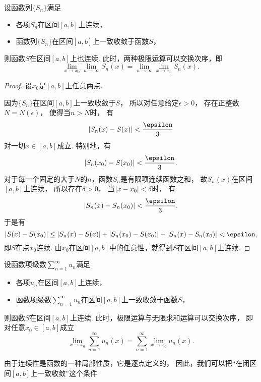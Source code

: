 \begin{theorem}\label{theorem:函数项级数.连续函数列的一致收敛性保证极限函数的连续性}
设函数列\(\{S_n\}\)满足\begin{itemize}
	\item 各项\(S_n\)在区间\([a,b]\)上连续，
	\item 函数列\(\{S_n\}\)在区间\([a,b]\)上一致收敛于函数\(S\)，
\end{itemize}
则函数\(S\)在区间\([a,b]\)上也连续.
此时，两种极限运算可以交换次序，即\[
	\lim_{x \to x_0} \lim_{n\to\infty} S_n(x)
	= \lim_{n\to\infty} \lim_{x \to x_0} S_n(x).
\]
\begin{proof}
设\(x_0\)是\([a,b]\)上任意两点.

因为\(\{S_n\}\)在区间\([a,b]\)上一致收敛于\(S\)，
所以对任意给定\(\epsilon>0\)，
存在正整数\(N = N(\epsilon)\)，
使得当\(n>N\)时，
有\[
	\abs{S_n(x) - S(x)} < \frac\epsilon3
\]对一切\(x\in[a,b]\)成立.
特别地，有\[
	\abs{S_n(x_0) - S(x_0)} < \frac\epsilon3.
\]
对于每一个固定的大于\(N\)的\(n\)，函数\(S_n\)是有限项连续函数之和，
故\(S_n(x)\)在区间\([a,b]\)上连续，
所以存在\(\delta>0\)，
当\(\abs{x - x_0} < \delta\)时，
有\[
	\abs{S_n(x) - S_n(x_0)} < \frac\epsilon3.
\]
于是有\[
	\abs{S(x) - S(x_0)}
	\leq \abs{S_n(x) - S(x)}
		+ \abs{S_n(x_0) - S(x_0)}
		+ \abs{S_n(x) - S_n(x_0)}
	< \epsilon,
\]
即\(S\)在点\(x_0\)连续.
由\(x_0\)在区间\([a,b]\)中的任意性，就得到\(S\)在区间\([a,b]\)上连续.
\end{proof}
\end{theorem}
\begin{theorem}\label{theorem:函数项级数.连续函数项级数的一致收敛性保证和函数的连续性}
设函数项级数\(\sum_{n=1}^\infty u_n\)满足\begin{itemize}
	\item 各项\(u_n\)在区间\([a,b]\)上连续，
	\item 函数项级数\(\sum_{n=1}^\infty u_n\)在区间\([a,b]\)上一致收敛于函数\(S\)，
\end{itemize}
则函数\(S\)在区间\([a,b]\)上连续.
此时，极限运算与无限求和运算可以交换次序，
即对任意\(x_0\in[a,b]\)成立\[
	\lim_{x \to x_0} \sum_{n=1}^\infty u_n(x)
	= \sum_{n=1}^\infty \lim_{x \to x_0} u_n(x).
\]
\end{theorem}
由于连续性是函数的一种局部性质，它是逐点定义的，
因此，我们可以把“在闭区间\([a,b]\)上一致收敛”这个条件
